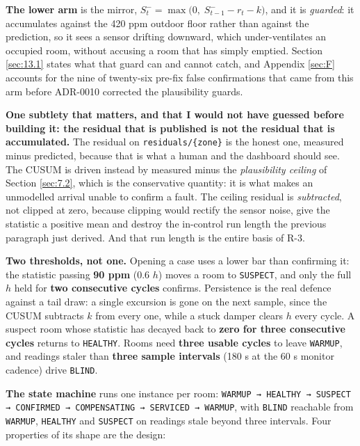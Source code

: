 \textbf{The lower arm} is the mirror, $S^{-}_t = \max\!\big(0,\; S^{-}_{t-1} - r_t - k\big)$, and it is
\emph{guarded}: it accumulates against the 420 ppm outdoor floor rather than against the prediction,
so it sees a sensor drifting downward, which under-ventilates an occupied room, without
accusing a room that has simply emptied. Section \ref{sec:13.1} states what that guard can and
cannot catch, and Appendix \ref{sec:F} accounts for the nine of twenty-six pre-fix false confirmations that
came from this arm before ADR-0010 corrected the plausibility guards.

\textbf{One subtlety that matters, and that I would not have guessed before building it: the
residual that is published is not the residual that is accumulated.} The residual on
\texttt{residuals/\{zone\}} is the honest one, measured minus predicted, because that is what a
human and the dashboard should see. The CUSUM is driven instead by measured minus the
\emph{plausibility ceiling} of Section \ref{sec:7.2}, which is the conservative quantity: it is what makes an
unmodelled arrival unable to confirm a fault. The ceiling residual is \emph{subtracted}, not clipped
at zero, because clipping would rectify the sensor noise, give the statistic a positive mean and
destroy the in-control run length the previous paragraph just derived. And that run length is the
entire basis of R-3.

\textbf{Two thresholds, not one.} Opening a case uses a lower bar than confirming it: the statistic
passing \textbf{90 ppm} (0.6 $h$) moves a room to \texttt{SUSPECT}, and only the full $h$ held for
\textbf{two consecutive cycles} confirms. Persistence is the real defence against a tail draw: a
single excursion is gone on the next sample, since the CUSUM subtracts $k$ from every one, while a
stuck damper clears $h$ every cycle. A suspect room whose statistic has decayed back to
\textbf{zero for three consecutive cycles} returns to \texttt{HEALTHY}. Rooms need
\textbf{three usable cycles} to leave \texttt{WARMUP}, and
readings staler than \textbf{three sample intervals} (180 s at the 60 s monitor cadence) drive
\texttt{BLIND}.

\textbf{The state machine} runs one instance per room:
\texttt{WARMUP → HEALTHY → SUSPECT → CONFIRMED → COMPENSATING → SERVICED → WARMUP}, with
\texttt{BLIND} reachable from \texttt{WARMUP}, \texttt{HEALTHY} and \texttt{SUSPECT} on readings
stale beyond three intervals. Four properties of its shape are the design:

